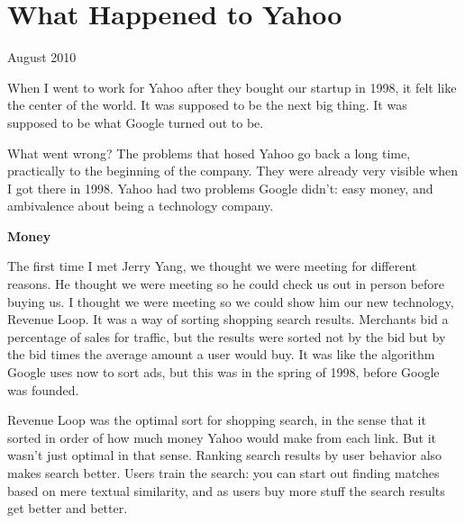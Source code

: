 \chapter{What Happened to Yahoo}


            
              
                


                  
                    August 2010

When I went to work for Yahoo after
                    they bought our startup in 1998, it felt like the center of
                    the world. It was supposed to be the next big thing. It was
                    supposed to be what Google turned out to be.

What
                    went wrong? The problems that hosed Yahoo go back a long
                    time, practically to the beginning of the company. They were
                    already very visible when I got there in 1998. Yahoo had two
                    problems Google didn't: easy money, and ambivalence about
                    being a technology company.

\textbf{Money}

The first time I met Jerry Yang, we thought we
                    were meeting for different reasons. He thought we were
                    meeting so he could check us out in person before buying us.
                    I thought we were meeting so we could show him our new
                    technology, Revenue Loop. It was a way of sorting shopping
                    search results. Merchants bid a percentage of sales for
                    traffic, but the results were sorted not by the bid but by
                    the bid times the average amount a user would buy. It was
                    like the algorithm Google uses now to sort ads, but this was
                    in the spring of 1998, before Google was founded.

Revenue
                    Loop was the optimal sort for shopping search, in the sense
                    that it sorted in order of how much money Yahoo would make
                    from each link. But it wasn't just optimal in that sense.
                    Ranking search results by user behavior also makes search
                    better. Users train the search: you can start out finding
                    matches based on mere textual similarity, and as users buy
                    more stuff the search results get better and better.

